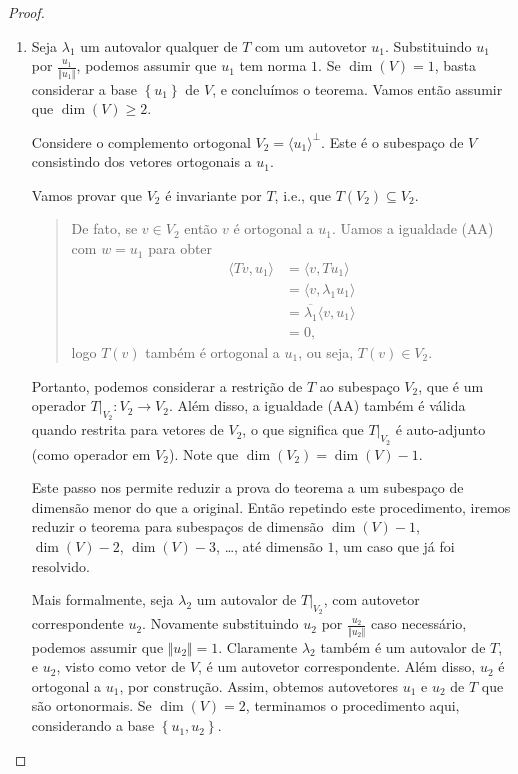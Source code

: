 \begin{proof}
\begin{enumerate}
		\item Seja $\lambda_1$ um autovalor qualquer de $T$ com um autovetor $u_1$. Substituindo $u_1$ por $\frac{u_1}{\Vert u_1\Vert}$, podemos assumir que $u_1$ tem norma $1$. Se $\dim(V)=1$, basta considerar a base $\left\{u_1\right\}$ de $V$, e concluímos o teorema. Vamos então assumir que $\dim(V)\geq 2$.
		
		Considere o complemento ortogonal $V_2=\langle u_1\rangle^\perp$. Este é o subespaço de $V$ consistindo dos vetores ortogonais a $u_1$.
		
		Vamos provar que $V_2$ é invariante por $T$, i.e., que $T(V_2)\subseteq V_2$.
		
		\begin{quote}
			De fato, se $v\in V_2$ então $v$ é ortogonal a $u_1$. Uamos a igualdade (AA) com $w=u_1$ para obter
			\begin{align*}
				\langle Tv,u_1\rangle
					&=\langle v,Tu_1\rangle\\
					&=\langle v,\lambda_1 u_1\rangle\\
					&=\overline{\lambda_1}\langle v,u_1\rangle\\
					&=0,
			\end{align*}\]
			logo $T(v)$ também é ortogonal a $u_1$, ou seja, $T(v)\in V_2$.
		\end{quote}
		
		Portanto, podemos considerar a restrição de $T$ ao subespaço $V_2$, que é um operador $T|_{V_2}\colon V_2\to V_2$. Além disso, a igualdade (AA) também é válida quando restrita para vetores de $V_2$, o que significa que $T|_{V_2}$ é auto-adjunto (como operador em $V_2$). Note que $\dim(V_2)=\dim(V)-1$.

		Este passo nos permite reduzir a prova do teorema a um subespaço de dimensão menor do que a original. Então repetindo este procedimento, iremos reduzir o teorema para subespaços de dimensão $\dim(V)-1$, $\dim(V)-2$, $\dim(V)-3$, \ldots, até dimensão $1$, um caso que já foi resolvido.
		
		Mais formalmente, seja $\lambda_2$ um autovalor de $T|_{V_2}$, com autovetor correspondente $u_2$. Novamente substituindo $u_2$ por $\frac{u_2}{\Vert u_2\Vert}$ caso necessário, podemos assumir que $\Vert u_2\Vert=1$. Claramente $\lambda_2$ também é um autovalor de $T$, e $u_2$, visto como vetor de $V$, é um autovetor correspondente. Além disso, $u_2$ é ortogonal a $u_1$, por construção. Assim, obtemos autovetores $u_1$ e $u_2$ de $T$ que são ortonormais. Se $\dim(V)=2$, terminamos o procedimento aqui, considerando a base $\left\{u_1,u_2\right\}$.
		

\end{enumerate}
\end{proof}
